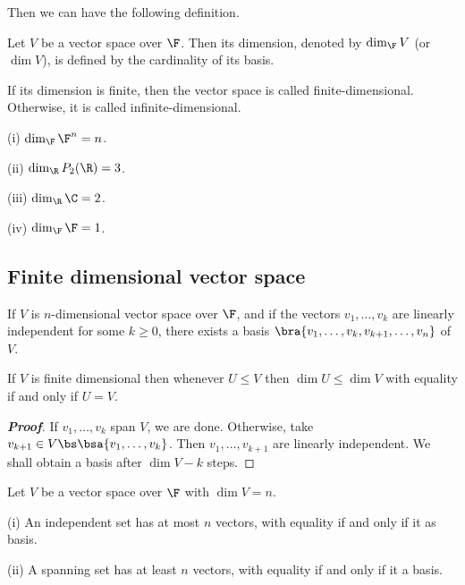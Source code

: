 Then we can have the following definition.

\begin{definition}\label{def:dimension_vector_space}
Let $V$ be a vector space over $\F$. Then its dimension, denoted by $\dim_{\F}V$ (or $\dim V$), is defined by the cardinality of its basis.

If its dimension is finite, then the vector space is called finite-dimensional. Otherwise, it is called infinite-dimensional.
\end{definition}


\begin{example}
\ben
\item [(i)] $\dim_\F \F^n = n$.
\item [(ii)] $\dim_\R P_2(\R) = 3$.
\item [(iii)] $\dim_\R \C = 2$.
\item [(iv)] $\dim_\F \F = 1$.
\een
\end{example}


\subsection{Finite dimensional vector space}

\begin{lemma}\label{lem:linearly_independent_extend_basis}
If $V$ is $n$-dimensional vector space over $\F$, and if the vectors $v_1, \dots, v_k$ are linearly independent for some $k \geq 0$, there exists a basis $\bra{v_1, \dots, v_k, v_{k+1}, \dots, v_n}$
of $V$.
\end{lemma}

\begin{remark}
If $V$ is finite dimensional then whenever $U \leq  V$ then $\dim U \leq \dim V$ with equality if and only if $U = V$.
\end{remark}

\begin{proof}[\bf Proof]
If $v_1, \dots, v_k$ span $V$, we are done. Otherwise, take $v_{k+1} \in V \bs \bsa{v_1, \dots, v_k}$. Then $v_1, \dots, v_{k+1}$ are linearly independent. We shall obtain a basis after $\dim V -k$ steps.
\end{proof}

\begin{lemma}\label{lem:independent_spanning_basis}
Let $V$ be a vector space over $\F$ with $\dim V = n$.
\ben
\item [(i)] An independent set has at most $n$ vectors, with equality if and only if it as basis.
\item [(ii)] A spanning set has at least $n$ vectors, with equality if and only if it a basis.
\een
\end{lemma}

